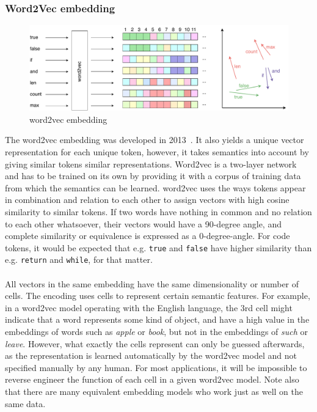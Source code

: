 \documentclass[
a4paper,
pagesize,
pdftex,
12pt,
twoside, %
BCOR=5mm, %
ngerman,
fleqn,
final,
]{scrartcl}
\begin{document}
	\subsubsection{Word2Vec embedding}\label{word2vec}
	\begin{figure}[ht]
		\centering
		\includegraphics[width=\linewidth]{img/word2vecEmbedding}
		\caption{word2vec embedding}
		\label{fig:word2vecEmbedding}
	\end{figure}
	The word2vec embedding was developed in 2013~\cite{Mikolov.2013}. It also yields a unique vector representation for each unique token, however, it takes semantics into account by giving similar tokens similar representations. Word2vec is a two-layer network and has to be trained on its own by providing it with a corpus of training data from which the semantics can be learned. word2vec uses the ways tokens appear in combination and relation to each other to assign vectors with high cosine similarity to similar tokens. If two words have nothing in common and no relation to each other whatsoever, their vectors would have a 90-degree angle, and complete similarity or equivalence is expressed as a 0-degree-angle. For code tokens, it would be expected that e.g. \texttt{true} and \texttt{false} have higher similarity than e.g. \texttt{return} and \texttt{while}, for that matter.\\\\
	All vectors in the same embedding have the same dimensionality or number of cells. The encoding uses cells to represent certain semantic features. For example, in a word2vec model operating with the English language, the 3rd cell might indicate that a word represents some kind of object, and have a high value in the embeddings of words such as \textit{apple} or \textit{book}, but not in the embeddings of \textit{such} or \textit{leave}. However, what exactly the cells represent can only be guessed afterwards, as the representation is learned automatically by the word2vec model and not specified manually by any human. For most applications, it will be impossible to reverse engineer the function of each cell in a given word2vec model. Note also that there are many equivalent embedding models who work just as well on the same data.\\ 
\end{document}

